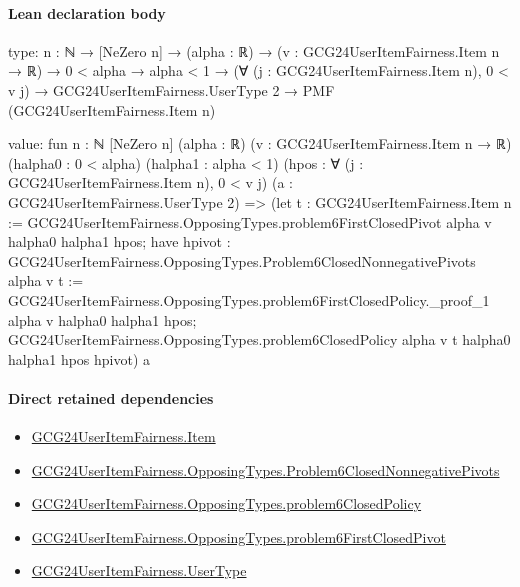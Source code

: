 \documentclass[10pt]{article}
\begin{document}
\paragraph{Lean declaration body}
\begin{ReviewVerbatim}
type:
{n : ℕ} →
  [NeZero n] →
    (alpha : ℝ) →
      (v : GCG24UserItemFairness.Item n → ℝ) →
        0 < alpha →
          alpha < 1 →
            (∀ (j : GCG24UserItemFairness.Item n), 0 < v j) →
              GCG24UserItemFairness.UserType 2 → PMF (GCG24UserItemFairness.Item n)

value:
fun {n : ℕ} [NeZero n] (alpha : ℝ) (v : GCG24UserItemFairness.Item n → ℝ) (halpha0 : 0 < alpha) (halpha1 : alpha < 1)
    (hpos : ∀ (j : GCG24UserItemFairness.Item n), 0 < v j) (a : GCG24UserItemFairness.UserType 2) =>
  (let t : GCG24UserItemFairness.Item n :=
      GCG24UserItemFairness.OpposingTypes.problem6FirstClosedPivot alpha v halpha0 halpha1 hpos;
    have hpivot : GCG24UserItemFairness.OpposingTypes.Problem6ClosedNonnegativePivots alpha v t :=
      GCG24UserItemFairness.OpposingTypes.problem6FirstClosedPolicy._proof_1 alpha v halpha0 halpha1 hpos;
    GCG24UserItemFairness.OpposingTypes.problem6ClosedPolicy alpha v t halpha0 halpha1 hpos hpivot)
    a
\end{ReviewVerbatim}

\paragraph{Direct retained dependencies}
\begin{itemize}\raggedright
\item \hyperlink{governing-declaration-a7c560a429c6e204}{GCG24\allowbreak{}User\allowbreak{}Item\allowbreak{}Fairness.\allowbreak{}Item}
\item \hyperlink{governing-declaration-0fdeda5b04cfe5ea}{GCG24\allowbreak{}User\allowbreak{}Item\allowbreak{}Fairness.\allowbreak{}Opposing\allowbreak{}Types.\allowbreak{}Problem6\allowbreak{}Closed\allowbreak{}Nonnegative\allowbreak{}Pivots}
\item \hyperlink{governing-declaration-9c5a74985da9e9b2}{GCG24\allowbreak{}User\allowbreak{}Item\allowbreak{}Fairness.\allowbreak{}Opposing\allowbreak{}Types.\allowbreak{}problem6\allowbreak{}Closed\allowbreak{}Policy}
\item \hyperlink{governing-declaration-006995e64ef81f97}{GCG24\allowbreak{}User\allowbreak{}Item\allowbreak{}Fairness.\allowbreak{}Opposing\allowbreak{}Types.\allowbreak{}problem6\allowbreak{}First\allowbreak{}Closed\allowbreak{}Pivot}
\item \hyperlink{governing-declaration-fd2c25ccc96ab645}{GCG24\allowbreak{}User\allowbreak{}Item\allowbreak{}Fairness.\allowbreak{}User\allowbreak{}Type}
\end{itemize}
\hypertarget{governing-declaration-dcccf6934fc47e52}{}
\end{document}
